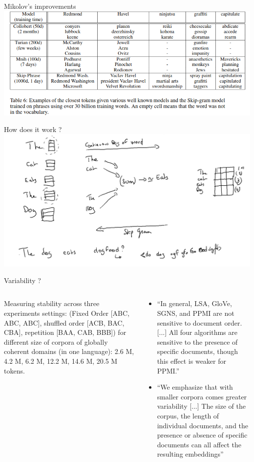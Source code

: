 \documentclass[aspectratio=169]{beamer}
\begin{document}
\begin{frame}{Mikolov's improvements}
    \centering
    \includegraphics[width=.9\linewidth]{nlp-for-ch/images/mikolov.png}
\end{frame}


\begin{frame}{How does it work ?}
    \centering
    \includegraphics[width=.8\linewidth]{nlp-for-ch/images/word2vec.png}
\end{frame}

\begin{frame}{Variability ?}
    \begin{columns}
        \begin{column}{.4\linewidth}
            Measuring stability across three experiments settings: (Fixed Order [ABC, ABC, ABC], shuffled order [ACB, BAC, CBA], repetition [BAA, CAB, BBB]) for different size of corpora of globally coherent domains (in one language): 2.6 M, 4.2 M, 6.2 M, 12.2 M, 14.6 M, 20.5 M tokens.
        \end{column}
        \begin{column}{.6\linewidth}
        \begin{itemize}
            \item ``In general, LSA, GloVe, SGNS, and PPMI are not sensitive to document order. [...] All four algorithms are sensitive to the presence of specific documents, though this effect is weaker for PPMI.''
            \item ``We emphasize that with smaller corpora comes greater variability [...] The size of the corpus, the length of individual documents, and the presence or absence of specific documents can all affect the resulting embeddings''
        \end{itemize}
        \end{column}
    \end{columns}
    \vspace{1em}
    {\small {}}
\end{frame}
\end{document}
